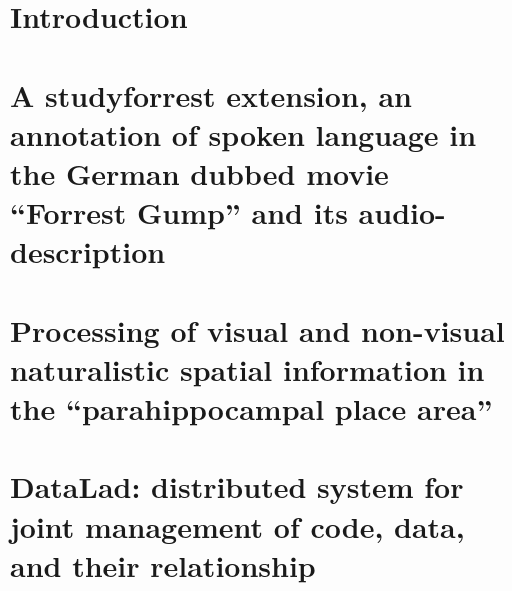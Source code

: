\documentclass[english,12pt]{report}
\begin{document}
\begin{spacing}{1.5}
\renewcommand{\baselinestretch}{1}\normalsize




\tableofcontents












\chapter{Introduction}
\setcounter{page}{1}






\chapter{A studyforrest extension, an annotation of spoken language in the
German dubbed movie ``Forrest Gump'' and its audio-description}






\chapter{Processing of visual and non-visual naturalistic spatial information in
the ``parahippocampal place area''}






\chapter{DataLad: distributed system for joint management of code, data, and
their relationship}







\end{spacing}
\end{document}
